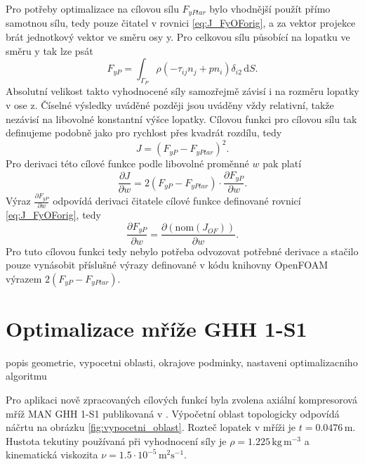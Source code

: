 Pro potřeby optimalizace na cílovou sílu $ F_{yPtar} $ bylo vhodnější použít přímo samotnou sílu, tedy pouze čitatel v rovnici \ref{eq:J_FyOForig}, a za vektor projekce brát jednotkový vektor ve směru osy y. Pro celkovou sílu působící na lopatku ve směru y tak lze psát
\begin{equation}\label{key}
F_{yP}=\int_{\Gamma_P} \rho (-\tau_{ij}n_j+pn_i)\delta_{i2}\,\mathrm{d}S.
\end{equation}
Absolutní velikost takto vyhodnocené síly samozřejmě závisí i na rozměru lopatky v ose z. Číselné výsledky uváděné později jsou uváděny vždy relativní, takže nezávisí na libovolné konstantní výšce lopatky. Cílovou funkci pro cílovou sílu tak definujeme podobně jako pro rychlost přes kvadrát rozdílu, tedy
\begin{equation}\label{eq:J_FyTarget}
J= (F_{yP} - F_{yPtar})^2.
\end{equation}
Pro derivaci této cílové funkce podle libovolné proměnné $ w $ pak platí
\begin{equation}\label{key}
\dfrac{\partial J}{\partial w} = 
2(F_{yP}-F_{yPtar}) \cdot \dfrac{\partial F_{yP}}{\partial w}.
\end{equation}
Výraz $ \frac{\partial F_{yP}}{\partial w} $ odpovídá derivaci čitatele cílové funkce definované rovnicí \ref{eq:J_FyOForig}, tedy
\begin{equation}\label{key}
\dfrac{\partial F_{yP}}{\partial w} = \dfrac{\partial (\mathrm{nom}(J_{OF}))}{\partial w}.
\end{equation}
Pro tuto cílovou funkci tedy nebylo potřeba odvozovat potřebné derivace a stačilo pouze vynásobit příslušné výrazy definované v kódu knihovny OpenFOAM výrazem $ 2(F_{yP}-F_{yPtar}) $.



\section{Optimalizace mříže GHH 1-S1}

popis geometrie, vypocetni oblasti, okrajove podminky, nastaveni optimalizacniho algoritmu

Pro aplikaci nově zpracovaných cílových funkcí byla zvolena axiální kompresorová mříž MAN GHH 1-S1 publikovaná v \cite{steinert1990design}.
Výpočetní oblast topologicky odpovídá náčrtu na obrázku \ref{fig:vypocetni_oblast}.
Rozteč lopatek v mříži je $ t=0.0476\,\mathrm{m} $. Hustota tekutiny používaná při vyhodnocení síly je $ \rho=1.225\,\mathrm{kg\,m^{-3}} $ a kinematická viskozita $ \nu = 1.5\cdot10^{-5} \, \mathrm{m^2s^{-1}} $.

